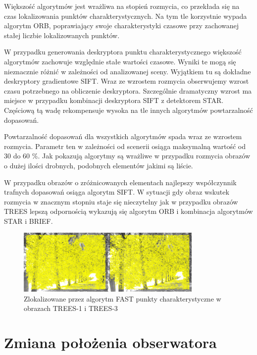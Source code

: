 Większość algorytmów jest wrażliwa na stopień rozmycia, co przekłada się na czas lokalizowania punktów charakterystycznych. Na tym tle korzystnie wypada algorytm ORB, poprawiający swoje charakterystyki czasowe przy zachowanej stałej liczbie lokalizowanych punktów.

W przypadku generowania deskryptora punktu charakterystycznego większość algorytmów zachowuje względnie stałe wartości czasowe. Wyniki te mogą się nieznacznie różnić w zależności od analizowanej sceny. Wyjątkiem tu są dokładne deskryptory gradientowe SIFT. Wraz ze wzrostem rozmycia obserwujemy wzrost czasu potrzebnego na obliczenie deskryptora. Szczególnie dramatyczny wzrost ma miejsce w przypadku kombinacji deskryptora SIFT z detektorem STAR. Częściową tą wadę rekompensuje wysoka na tle innych algorytmów powtarzalność dopasowań.

Powtarzalność dopasowań dla wszystkich algorytmów spada wraz ze wzrostem rozmycia. Parametr ten w zależności od scenerii osiąga maksymalną wartość od 30 do 60 \%. Jak pokazują algorytmy są wrażliwe w przypadku rozmycia obrazów o dużej ilości drobnych, podobnych elementów jakimi są liście.

W przypadku obrazów o zróżnicowanych elementach najlepszy współczynnik trafnych dopasowań osiąga algorytm SIFT. W sytuacji gdy obraz wskutek rozmycia w znacznym stopniu staje się nieczytelny jak w przypadku obrazów TREES lepszą odpornością wykazują się algorytm ORB i kombinacja algorytmów STAR i BRIEF.







\begin{figure}
\centering
\includegraphics[width=0.8\textwidth]{pict/badania/trees_fast_1_3.png}
\caption{Zlokalizowane przez algorytm FAST punkty charakterystyczne w obrazach TREES-1 i TREES-3}
\label{tt13}
\end{figure}





\FloatBarrier
\section{Zmiana położenia obserwatora}
\FloatBarrier
